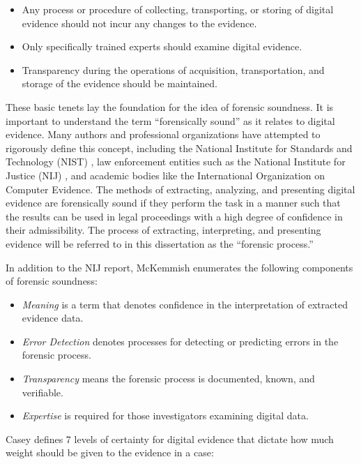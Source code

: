 \begin{itemize}
\item Any process or procedure of collecting, transporting, or storing of digital evidence should not incur any changes to the evidence.
\item Only specifically trained experts should examine digital evidence.
\item Transparency during the operations of acquisition, transportation, and storage of the evidence should be maintained.
\end{itemize}

These basic tenets lay the foundation for the idea of forensic soundness. It is important to understand the term “forensically sound” 
as it relates to digital evidence. Many authors and professional organizations have attempted to rigorously define this concept, 
including the National Institute for Standards and Technology (NIST) \cite{NIST2001}, law enforcement entities such as the National Institute for 
Justice (NIJ) \cite{NIJ2008}, and academic bodies like the International Organization on Computer Evidence\cite{IOCE2002}. The methods of extracting, analyzing, 
and presenting digital evidence are forensically sound if they perform the task in a manner such that the results can be used in legal 
proceedings with a high degree of confidence in their admissibility. The process of extracting, interpreting, and presenting evidence 
will be referred to in this dissertation as the “forensic process.”

In addition to the NIJ report, McKemmish \cite{mckemmish2008} enumerates the following components of forensic soundness:

\begin{itemize}
\item \emph{Meaning} is a term that denotes confidence in the interpretation of extracted evidence data.
\item \emph{Error Detection} denotes processes for detecting or predicting errors in the forensic process.
\item \emph{Transparency} means the forensic process is documented, known, and verifiable.
\item \emph{Expertise} is required for those investigators examining digital data.
\end{itemize}

Casey \cite{casey2002} defines 7 levels of certainty for digital evidence that dictate how much weight should be given to the evidence in a case:

